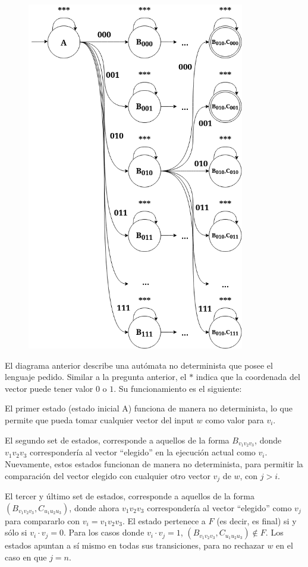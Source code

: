 \documentclass[letter]{article}
\begin{document}
\begin{pregunta}{2}
\begin{figure}[h]
    \centering
    \includegraphics[width=9.5cm]{NFA.drawio.png}
\end{figure}

El diagrama anterior describe una autómata no determinista que posee el lenguaje pedido. Similar a la pregunta anterior, el $*$ indica que la coordenada del vector puede tener valor $0$ o $1$. Su funcionamiento es el siguiente:

El primer estado (estado inicial A) funciona de manera no determinista, lo que permite que pueda tomar cualquier vector del input $w$ como valor para $v_i$. 

El segundo set de estados, corresponde a aquellos de la forma $B_{v_1v_2v_3}$, donde $v_1v_2v_3$ correspondería al vector ``elegido'' en la ejecución actual como $v_i$. Nuevamente, estos estados funcionan de manera no determinista, para permitir la comparación del vector elegido con cualquier otro vector $v_j$ de $w$, con $j > i$.

El tercer y último set de estados, corresponde a aquellos de la forma $(B_{v_1v_2v_3}, C_{u_1u_2u_3})$, donde ahora $v_1v_2v_3$ correspondería al vector ``elegido'' como $v_j$ para compararlo con $v_i = v_1v_2v_3$. El estado pertenece a $F$ (es decir, es final) si y sólo si $v_i \cdot v_j = 0$. Para los casos donde $v_i \cdot v_j = 1$, $(B_{v_1v_2v_3}, C_{u_1u_2u_3}) \notin F$. Los estados apuntan a sí mismo en todas sus transiciones, para no rechazar $w$ en el caso en que $j = n$.


\end{pregunta}
\end{document}
